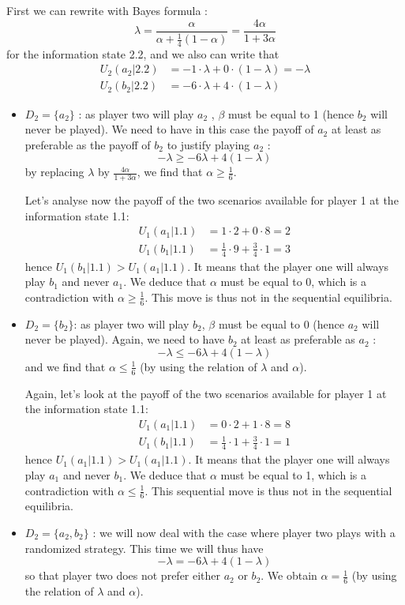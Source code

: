 First we can rewrite with Bayes formula : $$\lambda = \frac{\alpha}{\alpha + \frac{1}{4} (1-\alpha)} =\frac{4\alpha}{1+3\alpha}$$ for the information state 2.2, and we also can write that 
\begin{align*}
    U_2(a_2|2.2) &= -1 \cdot \lambda + 0 \cdot (1-\lambda) = -\lambda\\
    U_2(b_2|2.2) &= -6\cdot \lambda + 4 \cdot (1-\lambda) 
\end{align*} 
\begin{itemize}
    \item $D_2=\{a_2\}$ : as player two will play $a_2$ , $\beta$ must be equal to 1 (hence $b_2$ will never be played). We need to have in this case the payoff of $a_2$ at least as preferable as the payoff of  $b_2$ to justify playing $a_2$ : $$-\lambda \geq -6\lambda + 4 (1-\lambda)$$ by replacing $\lambda$ by $\frac{4\alpha}{1+3\alpha}$, we find that $\alpha \geq \frac{1}{6}$. 
    
    Let's analyse now the payoff of the two scenarios available for player 1 at the information state 1.1: 
    \begin{align*}
        U_1(a_1|1.1) &= 1 \cdot 2 + 0 \cdot 8 = 2\\
        U_1(b_1|1.1)& = \frac{1}{4} \cdot 9 + \frac{3}{4} \cdot 1 = 3
    \end{align*}
    hence $U_1(b_1|1.1)>U_1(a_1|1.1) $. It means that the player one will always play $b_1$  and never $a_1$. We deduce that $\alpha $ must be equal to 0, which is a contradiction with $\alpha \geq \frac{1}{6}$. This move is thus not in the sequential equilibria.
    \item $D_2=\{b_2\}$: as player two will play $b_2$, $\beta$ must be equal to 0 (hence $a_2$ will never be played). Again, we need to have $b_2$ at least as preferable as $a_2$ : $$-\lambda \leq -6\lambda + 4 (1-\lambda)$$
    and we find that $\alpha \leq \frac{1}{6}$ (by using the relation of $\lambda$ and $\alpha$). 
    
   Again, let's look at the payoff of the two scenarios available for player 1 at the information state 1.1: 
   \begin{align*}
       U_1(a_1|1.1) &= 0 \cdot 2 + 1 \cdot 8 = 8\\
       U_1(b_1|1.1) &= \frac{1}{4} \cdot 1 + \frac{3}{4} \cdot 1 = 1
   \end{align*} hence $U_1(a_1|1.1)>U_1(a_1|1.1) $. It means that the player one will always play $a_1$ and never $b_1$. We deduce that $\alpha$ must be equal to 1, which is a contradiction with $\alpha \leq \frac{1}{6}$. This sequential move is thus not in the sequential equilibria.
    \item $D_2=\{a_2,b_2\}$ : we will now deal with the case where player two plays with a randomized strategy. This time we will thus have 
    $$-\lambda = -6\lambda + 4 (1-\lambda)$$ so that player two does not prefer either $a_2$ or $b_2$. We obtain $\alpha = \frac{1}{6}$ (by using the relation of $\lambda$ and $\alpha$). 
    

\end{itemize}
